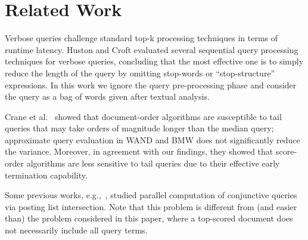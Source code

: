\section{Related Work}
\label{sec:related}

Verbose queries challenge standard top-k processing techniques in terms of runtime latency. Huston and Croft \cite{Huston:2010} evaluated several sequential query processing techniques for verbose queries, concluding that the most effective one is to simply reduce the length of the query by omitting stop-words or ``stop-structure'' expressions. 
In this work we ignore the query pre-processing phase and consider the query as a bag of words given after textual analysis.

Crane et al.~\cite{Crane:2017} showed that  document-order algorithms 
are susceptible to tail queries that may take orders of magnitude longer than the median query; approximate query evaluation in WAND and BMW does not significantly reduce the variance. Moreover, in agreement with our findings, they showed that score-order algorithms  are less sensitive to tail queries due to their effective early termination capability. 


Some previous works,  e.g.,~\cite{Tatikonda:2011,Liu:2018:GUC:3178487.3178512}, studied parallel computation  of conjunctive queries  via posting list intersection. 
Note that this problem is different from (and easier than) the problem considered in this paper, where a top-scored document does not necessarily include all query terms. 

